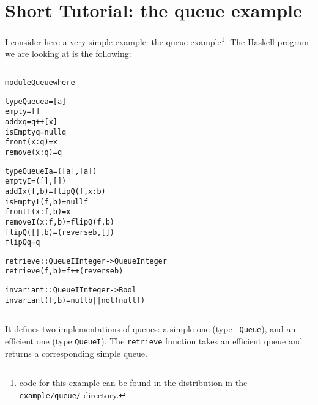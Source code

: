 \documentclass{article}
\newenvironment{shellcode}
  {\begin{alltt}\rule{7cm}{1pt}}
  {\rule{7cm}{1pt}\end{alltt}}
\begin{document}
\section{Short Tutorial: the queue example}

I consider here a very simple example: the queue example\footnote{code
for this example can be found in the distribution in the {\tt
example/queue/} directory.}. The {\sc Haskell} program we are looking
at is the following:
\begin{shellcode}
module Queue where 

type Queue a     = [a]
empty            = []
add x q          = q ++ [x]
isEmpty q        = null q
front  (x:q)     = x
remove (x:q)     = q

type QueueI a    = ([a], [a])
emptyI           = ([],[])
addI x (f,b)     = flipQ (f, x:b)
isEmptyI (f,b)   = null f
frontI  (x:f, b) = x
removeI (x:f, b) = flipQ (f, b)
flipQ ([], b)    = (reverse b, [])
flipQ q          = q

retrieve :: QueueI Integer -> Queue Integer
retrieve  (f,b) = f ++ (reverse b)

invariant :: QueueI Integer -> Bool
invariant (f,b) = null b || not (null f)
\end{shellcode}
It defines two implementations of queues: a simple one (type {\tt
Queue}), and an efficient one (type {\tt QueueI}). The {\tt retrieve}
function takes an efficient queue and returns a corresponding simple
queue.
\end{document}
